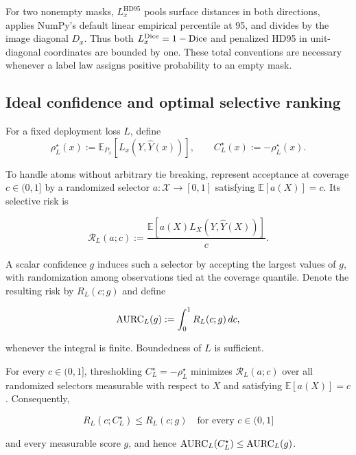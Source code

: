 For two nonempty masks, $L_x^{\mathrm{HD95}}$ pools surface distances in
both directions, applies NumPy's default linear empirical percentile at 95,
and divides by the image diagonal $D_x$. Thus both
$L_x^{\operatorname{Dice}}=1-\operatorname{Dice}$ and penalized HD95 in unit-diagonal coordinates are
bounded by one. These total conventions are necessary whenever a label law
assigns positive probability to an empty mask.

\subsection{Ideal confidence and optimal selective ranking}

\begin{definition}
\label{app:def:ideal-confidence}
For a fixed deployment loss $L$, define
\begin{equation*}
  \rho_L^\star(x)
  :=\mathbb{E}_{P_x}\!\left[L_x(Y,\widehat Y(x))\right],
  \qquad
  C_L^\star(x):=-\rho_L^\star(x).
\end{equation*}
\end{definition}

To handle atoms without arbitrary tie breaking, represent acceptance at
coverage $c\in(0,1]$ by a randomized selector
$a:\mathcal{X}\to[0,1]$ satisfying $\mathbb{E}[a(X)]=c$.  Its selective
risk is

\begin{equation*}
  \mathcal{R}_L(a;c)
  :=\frac{\mathbb{E}\!\left[
      a(X)L_X(Y,\widehat Y(X))\right]}{c}.
\end{equation*}

A scalar confidence $g$ induces such a selector by accepting the largest
values of $g$, with randomization among observations tied at the coverage
quantile.  Denote the resulting risk by $R_L(c;g)$ and define

\begin{equation*}
  \operatorname{AURC}_L(g):=\int_0^1 R_L(c;g)\,dc,
\end{equation*}

whenever the integral is finite.  Boundedness of $L$ is sufficient.

\begin{proposition}
\label{app:prop:optimal-ranking}
For every $c\in(0,1]$, thresholding $C_L^\star=-\rho_L^\star$ minimizes
$\mathcal{R}_L(a;c)$ over all randomized selectors measurable with
respect to $X$ and satisfying $\mathbb{E}[a(X)]=c$.  Consequently,

\begin{equation*}
  R_L(c;C_L^\star)\leq R_L(c;g)
  \quad\text{for every }c\in(0,1]
\end{equation*}

and every measurable score $g$, and hence
$\operatorname{AURC}_L(C_L^\star)\leq\operatorname{AURC}_L(g)$.
\end{proposition}

